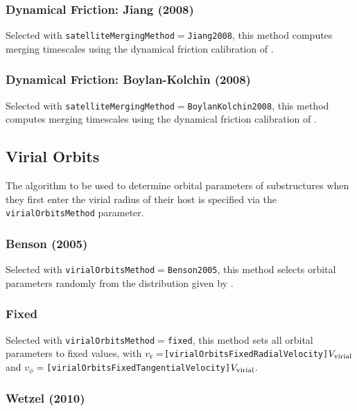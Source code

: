 \subsubsection{Dynamical Friction: Jiang (2008)}

Selected with {\tt satelliteMergingMethod}$=${\tt Jiang2008}, this method computes merging timescales using the dynamical friction calibration of \cite{jiang_fitting_2008}.

\subsubsection{Dynamical Friction: Boylan-Kolchin (2008)}

Selected with {\tt satelliteMergingMethod}$=${\tt BoylanKolchin2008}, this method computes merging timescales using the dynamical friction calibration of \cite{boylan-kolchin_dynamical_2008}.

\subsection{Virial Orbits}

The algorithm to be used to determine orbital parameters of substructures when they first enter the virial radius of their host is specified via the {\tt virialOrbitsMethod} parameter.

\subsubsection{Benson (2005)}

Selected with {\tt virialOrbitsMethod}$=${\tt Benson2005}, this method selects orbital parameters randomly from the distribution given by \cite{benson_orbital_2005}.

\subsubsection{Fixed}

Selected with {\tt virialOrbitsMethod}$=${\tt fixed}, this method sets all orbital parameters to fixed values, with $v_{\rm r}=${\tt [virialOrbitsFixedRadialVelocity]}$V_{\rm virial}$ and  $v_\phi=${\tt [virialOrbitsFixedTangentialVelocity]}$V_{\rm virial}$.

\subsubsection{Wetzel (2010)}

